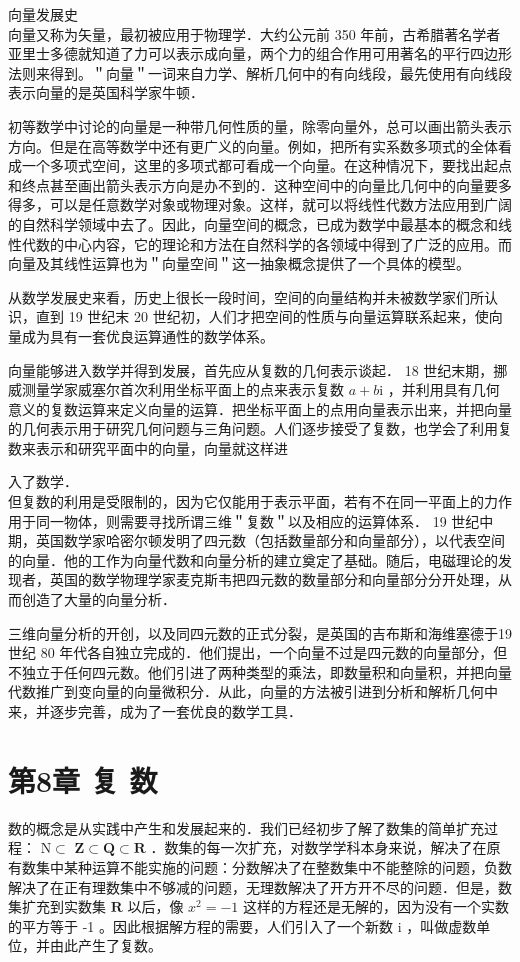 \documentclass[10pt]{article}
\begin{document}
向量发展史\\
向量又称为矢量，最初被应用于物理学．大约公元前 350 年前，古希腊著名学者亚里士多德就知道了力可以表示成向量，两个力的组合作用可用著名的平行四边形法则来得到。＂向量＂一词来自力学、解析几何中的有向线段，最先使用有向线段表示向量的是英国科学家牛顿．

初等数学中讨论的向量是一种带几何性质的量，除零向量外，总可以画出箭头表示方向。但是在高等数学中还有更广义的向量。例如，把所有实系数多项式的全体看成一个多项式空间，这里的多项式都可看成一个向量。在这种情况下，要找出起点和终点甚至画出箭头表示方向是办不到的．这种空间中的向量比几何中的向量要多得多，可以是任意数学对象或物理对象。这样，就可以将线性代数方法应用到广阔的自然科学领域中去了。因此，向量空间的概念，已成为数学中最基本的概念和线性代数的中心内容，它的理论和方法在自然科学的各领域中得到了广泛的应用。而向量及其线性运算也为＂向量空间＂这一抽象概念提供了一个具体的模型。

从数学发展史来看，历史上很长一段时间，空间的向量结构并未被数学家们所认识，直到 19 世纪末 20 世纪初，人们才把空间的性质与向量运算联系起来，使向量成为具有一套优良运算通性的数学体系。

向量能够进入数学并得到发展，首先应从复数的几何表示谈起． 18 世纪末期，挪威测量学家威塞尔首次利用坐标平面上的点来表示复数 \(a+b \mathrm{i}\) ，并利用具有几何意义的复数运算来定义向量的运算．把坐标平面上的点用向量表示出来，并把向量的几何表示用于研究几何问题与三角问题。人们逐步接受了复数，也学会了利用复数来表示和研究平面中的向量，向量就这样进

入了数学．\\
但复数的利用是受限制的，因为它仅能用于表示平面，若有不在同一平面上的力作用于同一物体，则需要寻找所谓三维＂复数＂以及相应的运算体系． 19 世纪中期，英国数学家哈密尔顿发明了四元数（包括数量部分和向量部分），以代表空间的向量．他的工作为向量代数和向量分析的建立奠定了基础。随后，电磁理论的发现者，英国的数学物理学家麦克斯韦把四元数的数量部分和向量部分分开处理，从而创造了大量的向量分析．

三维向量分析的开创，以及同四元数的正式分裂，是英国的吉布斯和海维塞德于19世纪 80 年代各自独立完成的．他们提出，一个向量不过是四元数的向量部分，但不独立于任何四元数。他们引进了两种类型的乘法，即数量积和向量积，并把向量代数推广到变向量的向量微积分．从此，向量的方法被引进到分析和解析几何中来，并逐步完善，成为了一套优良的数学工具．

\section*{第8章 复 数}
数的概念是从实践中产生和发展起来的．我们已经初步了解了数集的简单扩充过程： \(\mathrm{N} \subset\) \(\mathbf{Z} \subset \mathbf{Q} \subset \mathbf{R}\) ．数集的每一次扩充，对数学学科本身来说，解决了在原有数集中某种运算不能实施的问题：分数解决了在整数集中不能整除的问题，负数解决了在正有理数集中不够减的问题，无理数解决了开方开不尽的问题．但是，数集扩充到实数集 \(\mathbf{R}\) 以后，像 \(x^{2}=-1\) 这样的方程还是无解的，因为没有一个实数的平方等于 -1 。因此根据解方程的需要，人们引入了一个新数 i ，叫做虚数单位，并由此产生了复数。
\end{document}
